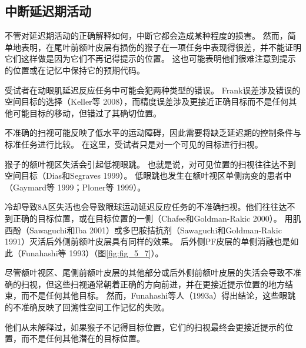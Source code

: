 \subsection{中断延迟期活动}

不管对延迟期活动的正确解释如何，中断它都会造成某种程度的损害。
然而，简单地表明，在尾叶前额叶皮层有损伤的猴子在一项任务中表现得很差，并不能证明它们这样做是因为它们不再记得提示的位置。
这也可能表明他们很难注意到提示的位置或在记忆中保持它的预期代码。


受试者在动眼肌延迟反应任务中可能会犯两种类型的错误。
Frank误差涉及错误的空间目标的选择（Keller等 2008），而精度误差涉及更接近正确目标而不是任何其他可能目标的移动，但错过了其确切位置。


不准确的扫视可能反映了低水平的运动障碍，因此需要将缺乏延迟期的控制条件与标准任务进行比较。
在这里，受试者只是对一个可见的目标进行扫视。


猴子的额叶视区失活会引起低视眼跳。
也就是说，对可见位置的扫视往往达不到空间目标（Dias和Segraves 1999）。
低眼跳也发生在额叶视区单侧病变的患者中（Gaymard等 1999；Ploner等 1999）。


冷却导致8A区失活也会导致眼球运动延迟反应任务的不准确扫视。他们往往达不到正确的目标位置，或在目标位置的一侧（Chafee和Goldman-Rakic 2000）。
用肌西酚（Sawaguchi和Iba 2001）或多巴胺拮抗剂（Sawaguchi和Goldman-Rakic 1991）灭活后外侧前额叶皮层具有同样的效果。
后外侧PF皮层的单侧消融也是如此（Funahashi等 1993）（图\ref{fig:fig_5_7}）。


尽管额叶视区、尾侧前额叶皮层的其他部分或后外侧前额叶皮层的失活会导致不准确的扫视，但这些扫视通常朝着正确的方向前进，并在更接近提示位置的地方结束，而不是任何其他目标。
然而，Funahashi等人（1993a）得出结论，这些眼跳的不准确反映了回溯性空间工作记忆的失败。


他们从未解释过，如果猴子不记得目标位置，它们的扫视最终会更接近提示的位置，而不是任何其他潜在的目标位置。


